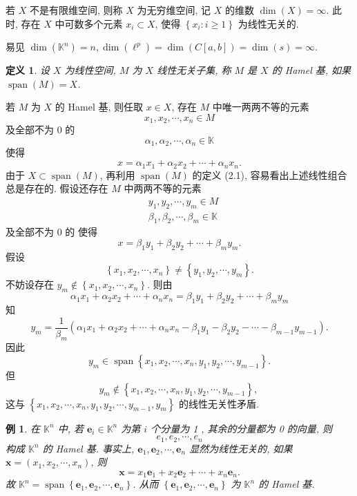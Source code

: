 \documentclass[openany]{ctexbook}
\theoremstyle{kaiti}
\newtheorem{definition}{定义}[section]
\theoremstyle{normal}
\newtheorem{example}{例}[section]
\begin{document}
若 $X$ 不是有限维空间, 则称 $X$ 为无穷维空间, 记 $X$ 的维数 $\operatorname{dim}(X)=\infty$. 此时, 存在 $X$ 中可数多个元素 $x_{i} \subset X$, 使得 $\left\{x_{i}: i \geqslant 1\right\}$ 为线性无关的.

易见 $\operatorname{dim}\left(\mathbb{K}^n\right)=n, \operatorname{dim}\left(\ell^{p}\right)=\operatorname{dim}(C[a, b])=\operatorname{dim}(s)=\infty$.
\begin{definition}
设 $X$ 为线性空间, $M$ 为 $X$ 线性无关子集, 称 $M$ 是 $X$ 的 Hamel 基, 如果 $\operatorname{span}(M)=X$.
\end{definition}

若 $M$ 为 $X$ 的 Hamel 基, 则任取 $x \in X$, 存在 $M$ 中唯一两两不等的元素
$$
x_1, x_2, \cdots, x_n \in M
$$
及全部不为 0 的
$$
\alpha_1, \alpha_2, \cdots, \alpha_n \in \mathbb{K}
$$
使得
$$
x=\alpha_1 x_1+\alpha_2 x_2+\cdots+\alpha_n x_n.
$$
由于 $X \subset \operatorname{span}(M)$, 再利用 $\operatorname{span}(M)$ 的定义 (2.1), 容易看出上述线性组合总是存在的. 假设还存在 $M$ 中两两不等的元素
$$
\begin{aligned}
&y_1, y_2, \cdots, y_m \in M \\
&\beta_1, \beta_2, \cdots, \beta_m \in \mathbb{K}
\end{aligned}
$$
及全部不为 0 的
使得
$$
x=\beta_1 y_1+\beta_2 y_2+\cdots+\beta_m y_m.
$$
假设
$$
\left\{x_1, x_2, \cdots, x_n\right\} \neq\left\{y_1, y_2, \cdots, y_m\right\}.
$$
不妨设存在 $y_m \notin\left\{x_1, x_2, \cdots, x_n\right\}$. 则由
$$
\alpha_1 x_1+\alpha_2 x_2+\cdots+\alpha_n x_n=\beta_1 y_1+\beta_2 y_2+\cdots+\beta_m y_m
$$
知
$$
y_m=\frac{1}{\beta_m}\left(\alpha_1 x_1+\alpha_2 x_2+\cdots+\alpha_n x_n-\beta_1 y_1-\beta_2 y_2-\cdots-\beta_{m-1} y_{m-1}\right).
$$
因此
$$
y_m \in \operatorname{span}\left\{x_1, x_2, \cdots, x_n, y_1, y_2, \cdots, y_{m-1}\right\}.
$$
但
$$
y_m \notin\left\{x_1, x_2, \cdots, x_n, y_1, y_2, \cdots, y_{m-1}\right\} \text {, }
$$
这与 $\left\{x_1, x_2, \cdots, x_n, y_1, y_2, \cdots, y_{m-1}, y_m\right\}$ 的线性无关性矛盾.

\begin{example}
在 $\mathbb{K}^n$ 中, 若 $\boldsymbol{e}_{i} \in \mathbb{K}^n$ 为第 $i$ 个分量为 1 , 其余的分量都为 0 的向量, 则
$$
e_1, e_2, \cdots, e_n
$$
构成 $\mathbb{K}^n$ 的 Hamel 基. 事实上, $\boldsymbol{e}_1, \boldsymbol{e}_2, \cdots, \boldsymbol{e}_n$ 显然为线性无关的, 如果 $\boldsymbol{x}=\left(x_1, x_2, \cdots, x_n\right)$, 则
$$
\boldsymbol{x}=x_1 \boldsymbol{e}_1+x_2 \boldsymbol{e}_2+\cdots+x_n \boldsymbol{e}_n.
$$
故 $\mathbb{K}^n=\operatorname{span}\left\{\boldsymbol{e}_1, \boldsymbol{e}_2, \cdots, \boldsymbol{e}_n\right\}$. 从而 $\left\{\boldsymbol{e}_1, \boldsymbol{e}_2, \cdots, \boldsymbol{e}_n\right\}$ 为 $\mathbb{K}^n$ 的 Hamel 基.
\end{example}
\end{document}
